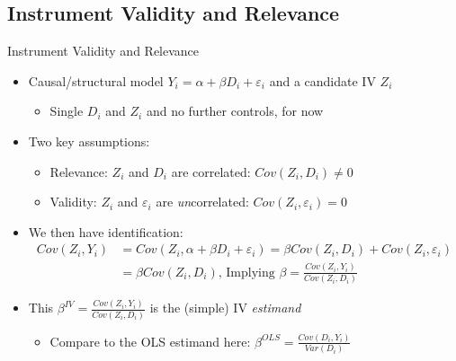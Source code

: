 \documentclass{beamer}
\begin{document}
\subsection{Instrument Validity and Relevance}
\begin{frame}{Instrument Validity and Relevance}
\begin{itemize}
\item Causal/structural model $Y_i=\alpha+\beta D_i+\varepsilon_i$ and a candidate IV $Z_i$ \smallskip
\begin{itemize}
\item Single $D_i$ and $Z_i$ and no further controls, for now
\end{itemize}\medskip\pause{}
\item Two key assumptions:\smallskip
\begin{itemize}
\item Relevance: $Z_i$ and $D_i$ are correlated: $Cov(Z_i,D_i)\neq 0$ \smallskip
\item Validity: $Z_i$ and $\varepsilon_i$ are \emph{un}correlated: $Cov(Z_i,\varepsilon_i)=0$
\end{itemize}\medskip\pause{}
\item We then have identification:\vspace{-0.3cm}
\begin{align*}
Cov(Z_i,Y_i)&=Cov(Z_i,\alpha+\beta D_i+\varepsilon_i)=\beta Cov(Z_i,D_i)+Cov(Z_i,\varepsilon_i)\\
&=\beta Cov(Z_i,D_i)\text{, Implying $\beta=\frac{Cov(Z_i,Y_i)}{Cov(Z_i,D_i)}$}
\end{align*}\pause{}\vspace{-0.3cm}
\item This $\beta^{IV}=\frac{Cov(Z_i,Y_i)}{Cov(Z_i,D_i)}$ is the (simple) IV \emph{estimand}\smallskip\pause{}
\begin{itemize}
\item Compare to the OLS estimand here: $\beta^{OLS}=\frac{Cov(D_i,Y_i)}{Var(D_i)}$ 
\end{itemize}
\end{itemize}
\end{frame}
\end{document}
